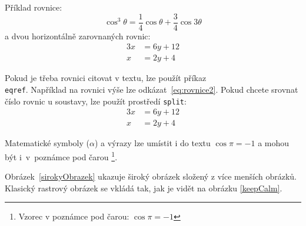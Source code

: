 
\noindent Příklad rovnice:
\begin{equation}
	\cos^3 \theta =\frac{1}{4}\cos\theta+\frac{3}{4}\cos 3\theta
	\label{eq:rovnice2}
\end{equation}
a dvou horizontálně zarovnaných rovnic: %
\begin{align}
    \label{eq:soustava}
	3x &= 6y + 12 \\
	x &= 2y + 4
\end{align}

Pokud je třeba rovnici citovat v textu, lze použít příkaz \texttt{\\eqref}. Například na rovnici výše lze odkázat~\eqref{eq:rovnice2}. Pokud chcete srovnat číslo rovnic u soustavy, lze použít prostředí \texttt{split}:
\begin{equation} \label{eq:soustavaSrovnana}
\begin{split}
	3x &= 6y + 12 \\
	x &= 2y + 4
\end{split}
\end{equation}

Matematické symboly ($\alpha$) a výrazy lze umístit i do textu $\cos\pi=-1$ a mohou být i~v~poznámce pod čarou%
\footnote{Vzorec v poznámce pod čarou: $\cos\pi=-1$}.

Obrázek~\ref{sirokyObrazek} ukazuje široký obrázek složený z více menších obrázků. Klasický rastrový obrázek se vkládá tak, jak je vidět na obrázku \ref{keepCalm}.


